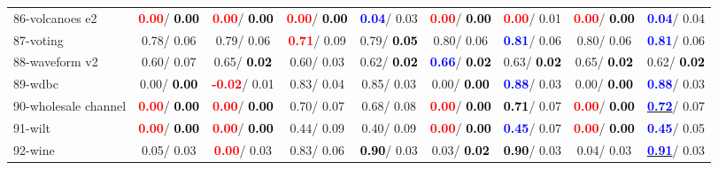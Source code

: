 \begin{table}[h]
\begin{center}
\begin{tabular}{lc|c|c|c|c|c|c|c}
86-volcanoes e2 & \textcolor{red}{\textbf{  0.00}}/\textcolor{black}{\textbf{  0.00}} & \textcolor{red}{\textbf{  0.00}}/\textcolor{black}{\textbf{  0.00}} & \textcolor{red}{\textbf{  0.00}}/\textcolor{black}{\textbf{  0.00}} & \textcolor{blue}{\textbf{  0.04}}/  0.03 & \textcolor{red}{\textbf{  0.00}}/\textcolor{black}{\textbf{  0.00}} & \textcolor{red}{\textbf{  0.00}}/  0.01 & \textcolor{red}{\textbf{  0.00}}/\textcolor{black}{\textbf{  0.00}} & \textcolor{blue}{\textbf{  0.04}}/  0.04 \\
87-voting &   0.78/  0.06 &   0.79/  0.06 & \textcolor{red}{\textbf{  0.71}}/  0.09 &   0.79/\textcolor{black}{\textbf{  0.05}} &   0.80/  0.06 & \textcolor{blue}{\textbf{  0.81}}/  0.06 &   0.80/  0.06 & \textcolor{blue}{\textbf{  0.81}}/  0.06 \\
88-waveform v2 &   0.60/  0.07 &   0.65/\textcolor{black}{\textbf{  0.02}} &   0.60/  0.03 &   0.62/\textcolor{black}{\textbf{  0.02}} & \textcolor{blue}{\textbf{  0.66}}/\textcolor{black}{\textbf{  0.02}} &   0.63/\textcolor{black}{\textbf{  0.02}} &   0.65/\textcolor{black}{\textbf{  0.02}} &   0.62/\textcolor{black}{\textbf{  0.02}} \\
89-wdbc &   0.00/\textcolor{black}{\textbf{  0.00}} & \textcolor{red}{\textbf{ -0.02}}/  0.01 &   0.83/  0.04 &   0.85/  0.03 &   0.00/\textcolor{black}{\textbf{  0.00}} & \textcolor{blue}{\textbf{  0.88}}/  0.03 &   0.00/\textcolor{black}{\textbf{  0.00}} & \textcolor{blue}{\textbf{  0.88}}/  0.03 \\
90-wholesale channel & \textcolor{red}{\textbf{  0.00}}/\textcolor{black}{\textbf{  0.00}} & \textcolor{red}{\textbf{  0.00}}/\textcolor{black}{\textbf{  0.00}} &   0.70/  0.07 &   0.68/  0.08 & \textcolor{red}{\textbf{  0.00}}/\textcolor{black}{\textbf{  0.00}} & \textcolor{black}{\textbf{  0.71}}/  0.07 & \textcolor{red}{\textbf{  0.00}}/\textcolor{black}{\textbf{  0.00}} & \underline{\textcolor{blue}{\textbf{  0.72}}}/  0.07 \\
91-wilt & \textcolor{red}{\textbf{  0.00}}/\textcolor{black}{\textbf{  0.00}} & \textcolor{red}{\textbf{  0.00}}/\textcolor{black}{\textbf{  0.00}} &   0.44/  0.09 &   0.40/  0.09 & \textcolor{red}{\textbf{  0.00}}/\textcolor{black}{\textbf{  0.00}} & \textcolor{blue}{\textbf{  0.45}}/  0.07 & \textcolor{red}{\textbf{  0.00}}/\textcolor{black}{\textbf{  0.00}} & \textcolor{blue}{\textbf{  0.45}}/  0.05 \\
92-wine &   0.05/  0.03 & \textcolor{red}{\textbf{  0.00}}/  0.03 &   0.83/  0.06 & \textcolor{black}{\textbf{  0.90}}/  0.03 &   0.03/\textcolor{black}{\textbf{  0.02}} & \textcolor{black}{\textbf{  0.90}}/  0.03 &   0.04/  0.03 & \underline{\textcolor{blue}{\textbf{  0.91}}}/  0.03 \\ \hline

\end{tabular}
\end{center}
\end{table}
